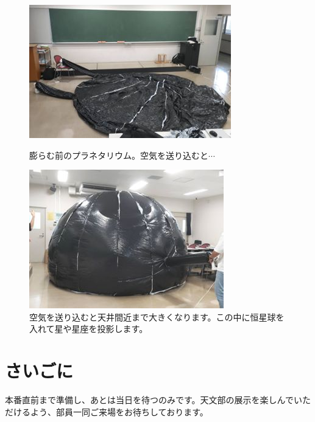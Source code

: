 \documentclass[../super_nova_20yy]{subfiles}
\begin{document}
\begin{figure}[H]
  \centering
  \begin{minipage}[t]{0.4\columnwidth}
    \centering
    \includegraphics[width=\columnwidth]{画像9.jpg}
    \caption{膨らむ前のプラネタリウム。空気を送り込むと$\cdots$}
    \label{fig:9}
  \end{minipage}
  \begin{minipage}[t]{0.4\columnwidth}
    \centering
    \includegraphics[width=\columnwidth]{画像10.jpg}
    \caption{空気を送り込むと天井間近まで大きくなります。この中に恒星球を入れて星や星座を投影します。}
    \label{fig:10}
  \end{minipage}
\end{figure}

\section{さいごに}
本番直前まで準備し、あとは当日を待つのみです。天文部の展示を楽しんでいただけるよう、部員一同ご来場をお待ちしております。

\onecolumn
\end{document}
